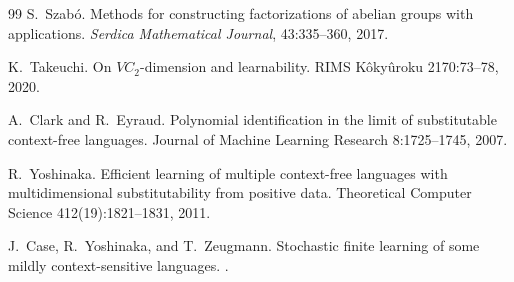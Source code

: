 \documentclass[11pt]{article}
\begin{document}
\begin{thebibliography}{99}
S.~Szab\'o.
\newblock Methods for constructing factorizations of abelian groups with applications.
\newblock \emph{Serdica Mathematical Journal}, 43:335--360, 2017.

K.~Takeuchi.
\newblock On \(VC_2\)-dimension and learnability.
\newblock RIMS K\^oky\^uroku 2170:73--78, 2020.

A.~Clark and R.~Eyraud.
\newblock Polynomial identification in the limit of substitutable context-free languages.
\newblock Journal of Machine Learning Research 8:1725--1745, 2007.

R.~Yoshinaka.
\newblock Efficient learning of multiple context-free languages with multidimensional substitutability from positive data.
\newblock Theoretical Computer Science 412(19):1821--1831, 2011.

J.~Case, R.~Yoshinaka, and T.~Zeugmann.
\newblock Stochastic finite learning of some mildly context-sensitive languages.
.

\end{thebibliography}
\end{document}
